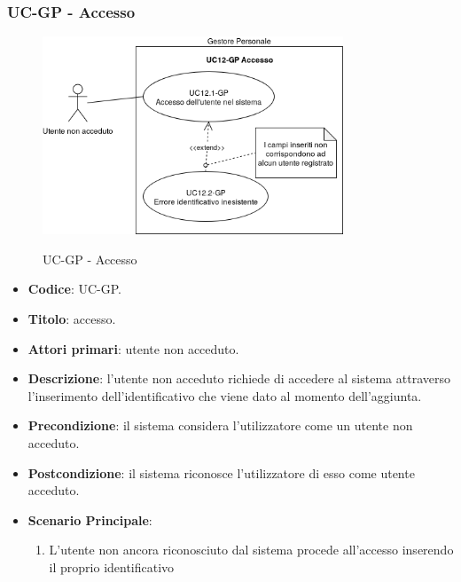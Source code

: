 \subsubsection{UC\theuccount-GP - Accesso}
		\begin{figure}[H]
			\centering
				\includegraphics[width=0.8\textwidth]{img/casi_d'uso/UC12.png}\\
			\caption{UC\theuccount-GP - Accesso}
		\end{figure}
	\begin{itemize}
		\item \textbf{Codice}: UC\theuccount-GP.
		\item \textbf{Titolo}: accesso.
		\item \textbf{Attori primari}: utente non acceduto.
		\item \textbf{Descrizione}: l'utente non acceduto richiede di accedere al sistema attraverso l'inserimento dell'identificativo che viene dato al momento dell'aggiunta.
		\item \textbf{Precondizione}: il sistema considera l’utilizzatore come un utente non acceduto.
		\item \textbf{Postcondizione}: il sistema riconosce l'utilizzatore di esso come utente acceduto.
		\item \textbf{Scenario Principale}:
		\begin{enumerate}
			\item L'utente non ancora riconosciuto dal sistema procede all'accesso inserendo il proprio identificativo
		\end{enumerate}
	\end{itemize}
	

